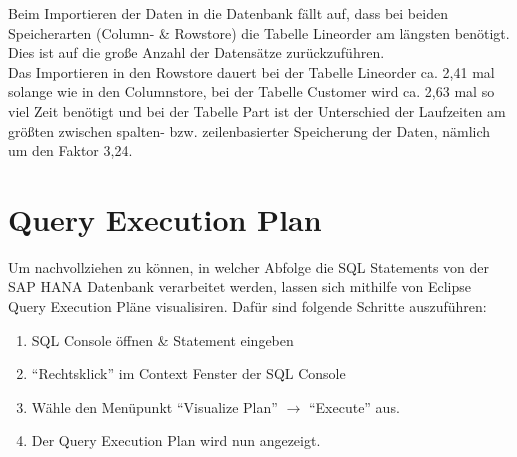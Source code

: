 Beim Importieren der Daten in die Datenbank fällt auf, dass bei beiden Speicherarten (Column- \& Rowstore) die Tabelle Lineorder am längsten benötigt. Dies ist auf die große Anzahl der Datensätze zurückzuführen.\\
Das Importieren in den Rowstore dauert bei der Tabelle Lineorder ca. 2,41 mal solange wie in den Columnstore, bei der Tabelle Customer wird ca. 2,63 mal so viel Zeit benötigt und bei der Tabelle Part ist der Unterschied der Laufzeiten am größten zwischen spalten- bzw. zeilenbasierter Speicherung der Daten, nämlich um den Faktor 3,24. 

\section{Query Execution Plan}
Um nachvollziehen zu können, in welcher Abfolge die SQL Statements von der SAP HANA Datenbank verarbeitet werden, lassen sich mithilfe von Eclipse Query Execution Pläne visualisiren.
Dafür sind folgende Schritte auszuführen:
\begin{enumerate}
	\item SQL Console öffnen \& Statement eingeben
	\item \enquote{Rechtsklick} im Context Fenster der SQL Console
	\item Wähle den Menüpunkt \enquote{Visualize Plan} $\rightarrow$ \enquote{Execute} aus.
	\item Der Query Execution Plan wird nun angezeigt.
\end{enumerate} 
